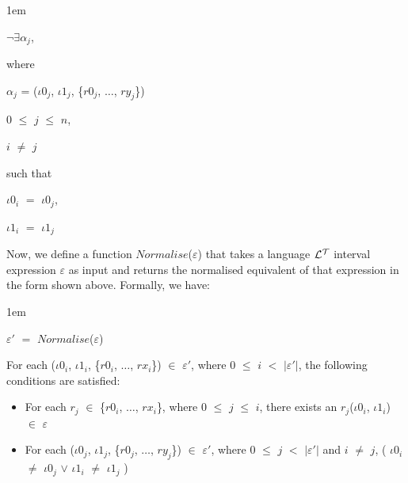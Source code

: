 \documentclass[11pt]{report}
\newenvironment{vquote}
{
  \begin{list}{}{\leftmargin 1em}\item[]
}
{
  \end{list}
}
\begin{document}
\begin{itemize}
              \begin{vquote}
                $\lnot$$\exists$${\alpha}_j$,

                where

                \hspace{1em}
                ${\alpha}_j$ =
                  (${\iota}0_j$, ${\iota}1_j$, \{$r0_j$, $\ldots$, $ry_j$\})

                \hspace{1em}
                $0$ $\leq$ $j$ $\leq$ $n$,

                \hspace{1em}
                $i$ $\neq$ $j$

                such that

                \hspace{1em}
                ${\iota}0_i$ $=$ ${\iota}0_j$,

                \hspace{1em}
                ${\iota}1_i$ $=$ ${\iota}1_j$
              \end{vquote}

              Now, we define a function $Normalise$($\varepsilon$) that takes
              a language ${\cal L^T}$ interval expression $\varepsilon$ as
              input and returns the normalised equivalent of that expression in
              the form shown above. Formally, we have:

              \begin{vquote}
                ${\varepsilon}'$ $=$ $Normalise$($\varepsilon$)
              \end{vquote}

              \noindent
              For each
              (${\iota}0_i$, ${\iota}1_i$, \{$r0_i$, $\ldots$, $rx_i$\})
              $\in$ ${\varepsilon}'$,
              where $0$ $\leq$ $i$ $<$ $|{\varepsilon}'|$, the following
              conditions are satisfied:

              \begin{itemize}
                \item
                  For each $r_j$ $\in$ \{$r0_i$, $\ldots$, $rx_i$\}, where $0$
                  $\leq$ $j$ $\leq$ $i$, there exists an
                  $r_j$(${\iota}0_i$, ${\iota}1_i$) $\in$ $\varepsilon$

                \item
                  For each
                  (${\iota}0_j$, ${\iota}1_j$, \{$r0_j$, $\ldots$, $ry_j$\})
                  $\in$ ${\varepsilon}'$, where $0$ $\leq$ $j$ $<$
                  $|{\varepsilon}'|$ and $i$ $\neq$ $j$,
                  (
                    ${\iota}0_i$ $\neq$ ${\iota}0_j$ $\lor$
                    ${\iota}1_i$ $\neq$ ${\iota}1_j$
                  )
              \end{itemize}


\end{itemize}
\end{document}
